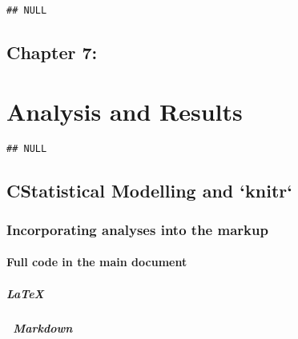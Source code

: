 \documentclass[ChapterTOCs,krantz1]{krantz}\usepackage{graphicx, color}
\makeatletter
\newenvironment{kframe}{%
 \def\at@end@of@kframe{}%
 \ifinner\ifhmode%
  \def\at@end@of@kframe{\end{minipage}}%
  \begin{minipage}{\columnwidth}%
 \fi\fi%
 \def\FrameCommand##1{\hskip\@totalleftmargin \hskip-\fboxsep
 \colorbox{shadecolor}{##1}\hskip-\fboxsep
     \hskip-\linewidth \hskip-\@totalleftmargin \hskip\columnwidth}%
 \MakeFramed {\advance\hsize-\width
   \@totalleftmargin\z@ \linewidth\hsize
   \@setminipage}}%
 {\par\unskip\endMakeFramed%
 \at@end@of@kframe}
\newenvironment{knitrout}{}{} %
\makeatother
\begin{document}
\begin{knitrout}
\color{fgcolor}\begin{kframe}
\begin{verbatim}
## NULL
\end{verbatim}
\end{kframe}
\end{knitrout}


\chapter{Chapter 7:}



\part{Analysis and Results}


\begin{knitrout}
\color{fgcolor}\begin{kframe}
\begin{verbatim}
## NULL
\end{verbatim}
\end{kframe}
\end{knitrout}


\chapter{CStatistical Modelling and `knitr`}

\section{Incorporating analyses into the markup}

\subsection{Full code in the main document}

\subsubsection{\LaTeX  }

\subsubsection{~Markdown}
\end{document}
